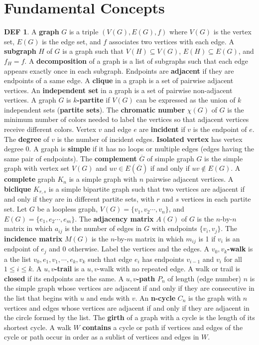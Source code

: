 \documentclass[11pt]{article}
\theoremstyle{definition}
\newtheorem*{defin}{DEF}
\theoremstyle{dotles}
\theoremstyle{dotless}
\theoremstyle{remark}
\begin{document}
\section{Fundamental Concepts}

\begin{defin}
A \textbf{graph} $G$ is a triple $(V(G),E(G),f)$ where $V(G)$ is the vertex set, $E(G)$ is the edge set, and $f$ associates two vertices with each edge. A \textbf{subgraph} $H$ of $G$ is a graph such that $V(H)\subseteq V(G)$, $E(H)\subseteq E(G)$, and $f_H=f$. A \textbf{decomposition} of a graph is a list of subgraphs such that each edge appears exactly once in each subgraph.\medbreak
Endpoints are \textbf{adjacent} if they are endpoints of a same edge. A \textbf{clique} in a graph is a set of pairwise adjacent vertices. An \textbf{independent set} in a graph is a set of pairwise non-adjacent vertices. A graph $G$ is \textbf{$k$-partite} if $V(G)$ can be expressed as the union of $k$ independent sets (\textbf{partite sets}). The \textbf{chromatic number} $\chi(G)$ of $G$ is the minimum number of colors needed to label the vertices so that adjacent vertices receive different colors. Vertex $v$ and edge $e$ are \textbf{incident} if $v$ is the endpoint of $e$. The \textbf{degree} of $v$ is the number of incident edges. \textbf{Isolated vertex} has vertex degree 0.\medbreak
A graph is \textbf{simple} if it has no loops or multiple edges (edges having the same pair of endpoints). The \textbf{complement} $\overline{G}$ of simple graph $G$ is the simple graph with vertex set $V(G)$ and $uv\in E(\overline{G})$ if and only if $uv\not\in E(G)$. A \textbf{complete} graph $K_n$ is a simple graph with $n$ pairwise adjacent vertices. A \textbf{biclique} $K_{r,s}$ is a simple bipartite graph such that two vertices are adjacent if and only if they are in different partite sets, with $r$ and $s$ vertices in each partite set.\medbreak
Let $G$ be a loopless graph, $V(G)=\{v_1,v_2\cdots,v_n\}$, and $E(G)=\{e_1,e_2\cdots,e_m\}$. The \textbf{adjacency matrix} $A(G)$ of $G$ is the $n$-by-$n$ matrix in which $a_{ij}$ is the number of edges in $G$ with endpoints $\{v_i,v_j\}$. The \textbf{incidence matrix} $M(G)$ is the $n$-by-$m$ matrix in which $m_{ij}$ is 1 if $v_i$ is an endpoint of $e_j$ and 0 otherwise.\medbreak
Label the vertices and the edges. A \textbf{$v_0,v_k$-walk} is a the list $v_0,e_1,v_1,\cdots,e_k,v_k$ such that edge $e_i$ has endpoints $v_{i-1}$ and $v_i$ for all $1\leq i\leq k$. A \textbf{$u,v$-trail} is a $u,v$-walk with no repeated edge. A walk or trail is \textbf{closed} if its endpoints are the same. A \textbf{$u,v$-path} $P_n$ of length (edge number) $n$ is the simple graph whose vertices are adjacent if and only if they are consecutive in the list that begins with $u$ and ends with $v$. An \textbf{n-cycle} $C_n$ is the graph with $n$ vertices and edges whose vertices are adjacent if and only if they are adjacent in the circle formed by the list. The \textbf{girth} of a graph with a cycle is the length of its shortest cycle. A walk $W$ \textbf{contains} a cycle or path if vertices and edges of the cycle or path occur in order as a sublist of vertices and edges in $W$.\medbreak

\end{defin}
\end{document}
